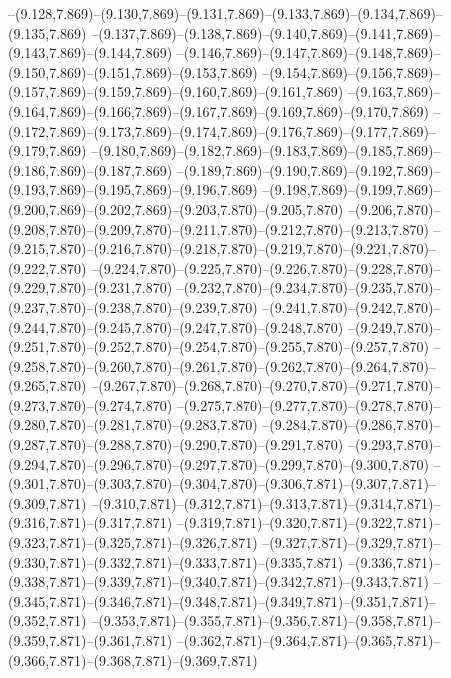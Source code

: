   --(9.128,7.869)--(9.130,7.869)--(9.131,7.869)--(9.133,7.869)--(9.134,7.869)--(9.135,7.869)%
  --(9.137,7.869)--(9.138,7.869)--(9.140,7.869)--(9.141,7.869)--(9.143,7.869)--(9.144,7.869)%
  --(9.146,7.869)--(9.147,7.869)--(9.148,7.869)--(9.150,7.869)--(9.151,7.869)--(9.153,7.869)%
  --(9.154,7.869)--(9.156,7.869)--(9.157,7.869)--(9.159,7.869)--(9.160,7.869)--(9.161,7.869)%
  --(9.163,7.869)--(9.164,7.869)--(9.166,7.869)--(9.167,7.869)--(9.169,7.869)--(9.170,7.869)%
  --(9.172,7.869)--(9.173,7.869)--(9.174,7.869)--(9.176,7.869)--(9.177,7.869)--(9.179,7.869)%
  --(9.180,7.869)--(9.182,7.869)--(9.183,7.869)--(9.185,7.869)--(9.186,7.869)--(9.187,7.869)%
  --(9.189,7.869)--(9.190,7.869)--(9.192,7.869)--(9.193,7.869)--(9.195,7.869)--(9.196,7.869)%
  --(9.198,7.869)--(9.199,7.869)--(9.200,7.869)--(9.202,7.869)--(9.203,7.870)--(9.205,7.870)%
  --(9.206,7.870)--(9.208,7.870)--(9.209,7.870)--(9.211,7.870)--(9.212,7.870)--(9.213,7.870)%
  --(9.215,7.870)--(9.216,7.870)--(9.218,7.870)--(9.219,7.870)--(9.221,7.870)--(9.222,7.870)%
  --(9.224,7.870)--(9.225,7.870)--(9.226,7.870)--(9.228,7.870)--(9.229,7.870)--(9.231,7.870)%
  --(9.232,7.870)--(9.234,7.870)--(9.235,7.870)--(9.237,7.870)--(9.238,7.870)--(9.239,7.870)%
  --(9.241,7.870)--(9.242,7.870)--(9.244,7.870)--(9.245,7.870)--(9.247,7.870)--(9.248,7.870)%
  --(9.249,7.870)--(9.251,7.870)--(9.252,7.870)--(9.254,7.870)--(9.255,7.870)--(9.257,7.870)%
  --(9.258,7.870)--(9.260,7.870)--(9.261,7.870)--(9.262,7.870)--(9.264,7.870)--(9.265,7.870)%
  --(9.267,7.870)--(9.268,7.870)--(9.270,7.870)--(9.271,7.870)--(9.273,7.870)--(9.274,7.870)%
  --(9.275,7.870)--(9.277,7.870)--(9.278,7.870)--(9.280,7.870)--(9.281,7.870)--(9.283,7.870)%
  --(9.284,7.870)--(9.286,7.870)--(9.287,7.870)--(9.288,7.870)--(9.290,7.870)--(9.291,7.870)%
  --(9.293,7.870)--(9.294,7.870)--(9.296,7.870)--(9.297,7.870)--(9.299,7.870)--(9.300,7.870)%
  --(9.301,7.870)--(9.303,7.870)--(9.304,7.870)--(9.306,7.871)--(9.307,7.871)--(9.309,7.871)%
  --(9.310,7.871)--(9.312,7.871)--(9.313,7.871)--(9.314,7.871)--(9.316,7.871)--(9.317,7.871)%
  --(9.319,7.871)--(9.320,7.871)--(9.322,7.871)--(9.323,7.871)--(9.325,7.871)--(9.326,7.871)%
  --(9.327,7.871)--(9.329,7.871)--(9.330,7.871)--(9.332,7.871)--(9.333,7.871)--(9.335,7.871)%
  --(9.336,7.871)--(9.338,7.871)--(9.339,7.871)--(9.340,7.871)--(9.342,7.871)--(9.343,7.871)%
  --(9.345,7.871)--(9.346,7.871)--(9.348,7.871)--(9.349,7.871)--(9.351,7.871)--(9.352,7.871)%
  --(9.353,7.871)--(9.355,7.871)--(9.356,7.871)--(9.358,7.871)--(9.359,7.871)--(9.361,7.871)%
  --(9.362,7.871)--(9.364,7.871)--(9.365,7.871)--(9.366,7.871)--(9.368,7.871)--(9.369,7.871)%
